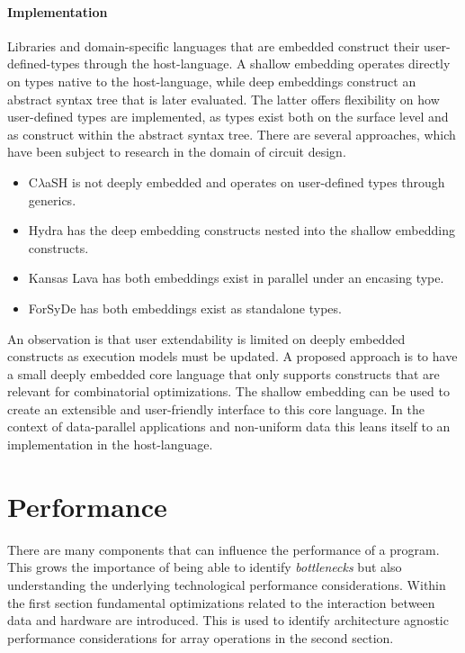 \documentclass{article}
\begin{document}
\paragraph{Implementation}

Libraries and domain-specific languages that are embedded construct their user-defined-types through the host-language.
A shallow embedding operates directly on types native to the host-language, while deep embeddings construct an abstract syntax tree that is later evaluated.
The latter offers flexibility on how user-defined types are implemented, as types exist both on the surface level and as construct within the abstract syntax tree.   
There are several approaches, which have been subject to research in the domain of circuit design.
\begin{itemize}
    \setlength\itemsep{0em}
    \item {C$\lambda$aSH} is not deeply embedded and operates on user-defined types through generics\cite{clash}. 
    \item Hydra has the deep embedding constructs nested into the shallow embedding constructs\cite{hydra}.
    \item Kansas Lava has both embeddings exist in parallel under an encasing type\cite{kansas-lava}.
    \item ForSyDe has both embeddings exist as standalone types\cite{forsyde}.
\end{itemize}

An observation is that user extendability is limited on deeply embedded constructs as execution models must be updated.
A proposed approach is to have a small deeply embedded core language that only supports constructs that are relevant for combinatorial optimizations\cite{shallow-and-deep}. 
The shallow embedding can be used to create an extensible and user-friendly interface to this core language.
In the context of data-parallel applications and non-uniform data this leans itself to an implementation in the host-language.

\newpage

\section{Performance}

There are many components that can influence the performance of a program.
This grows the importance of being able to identify {\it bottlenecks} but also understanding the underlying technological performance considerations\cite{programming-optimization}.
Within the first section fundamental optimizations related to the interaction between data and hardware are introduced.
This is used to identify architecture agnostic performance considerations for array operations in the second section.
\end{document}
